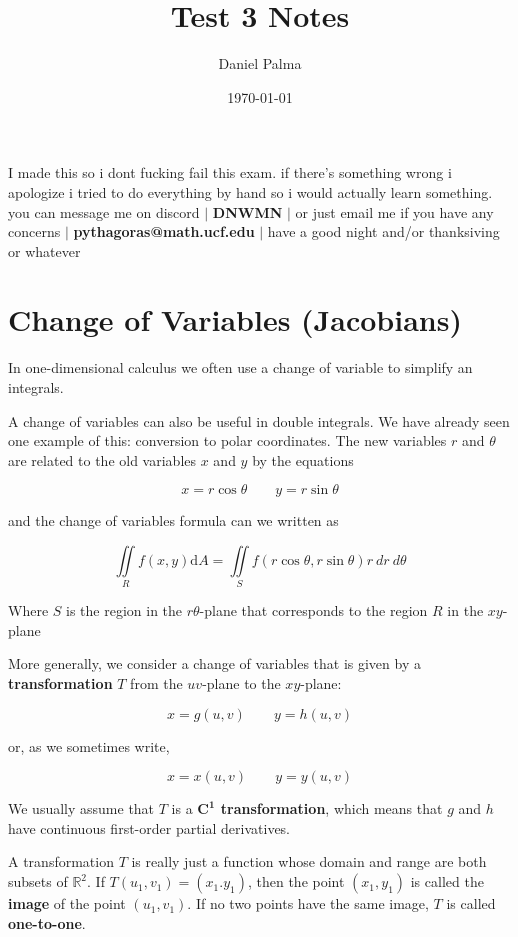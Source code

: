 \documentclass{article}
\author{Daniel Palma}
\date{\today}
\title{Test 3 Notes}
\begin{document}
\maketitle
\newpage

I made this so i dont fucking fail this exam. if there's something wrong i apologize i tried to do everything by hand so i would actually learn something. you can message me on discord $ \rvert$ \textbf{DNWMN} $ \rvert$ or just email me if you have any concerns $\rvert $ \textbf{pythagoras@math.ucf.edu }$ \rvert$ have a good night and/or thanksiving or whatever 

\tableofcontents
\newpage

\section{Change of Variables (Jacobians)}

In one-dimensional calculus we often use a change of variable to simplify an integrals.

A change of variables can also be useful in double integrals. We have already seen one example of this: conversion to polar coordinates. The new variables $r$ and $\theta$ are related to the old variables $x$ and $y$ by the equations 

$$ x = r \cos{\theta} \qquad y = r \sin{\theta} $$

and the change of variables formula can we written as 

$$\iint\limits_{R} f(x,y) \mathrm{d}A = \iint\limits_{S} f(r\cos{\theta}, r\sin{\theta})r \ dr \ d\theta$$

Where $S$ is the region in the $r\theta$-plane that corresponds to the region $R$ in the $xy$-plane

More generally, we consider a change of variables that is given by a \textbf{transformation} $T$ from the $uv$-plane to the $xy$-plane:

$$x = g(u,v) \qquad y = h(u,v)$$

or, as we sometimes write,

$$x = x(u,v) \qquad y = y(u,v)$$

We usually assume that $T$ is a \textbf{$\mathbf{C^1}$ transformation}, which means that $g$ and $h$ have continuous first-order partial derivatives.

A transformation $T$ is really just a function whose domain and range are both subsets of $\mathbb{R}^2$. If $T(u_1, v_1) = (x_1.y_1)$, then the point $(x_1,y_1)$ is called the \textbf{image} of the point $(u_1, v_1)$. If no two points have the same image, $T$ is called \textbf{one-to-one}. 
\end{document}
